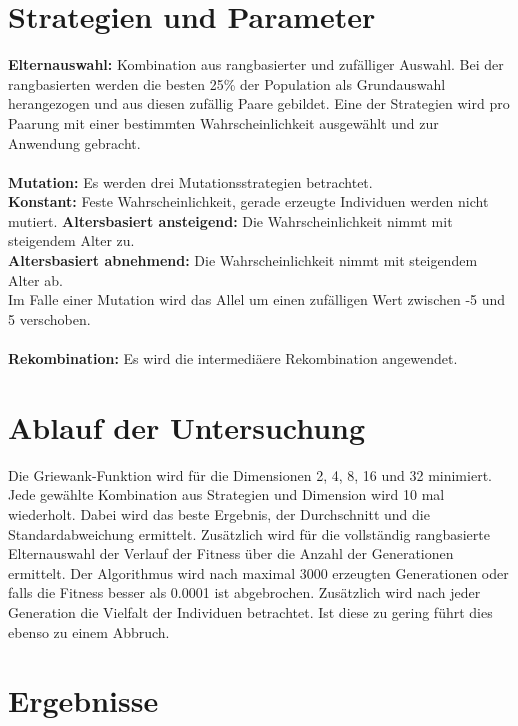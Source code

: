 \documentclass[12pt,
    a4paper,
    headinclude,
    footinclude]{scrartcl}
\begin{document}
	\section{Strategien und Parameter}

	\textbf{Elternauswahl:} Kombination aus rangbasierter und zufälliger Auswahl. Bei der rangbasierten werden die besten 25\% der Population als Grundauswahl herangezogen und aus diesen zufällig Paare gebildet.
	Eine der Strategien wird pro Paarung mit einer bestimmten Wahrscheinlichkeit ausgewählt und zur Anwendung gebracht. \\\\	
	\textbf{Mutation:} Es werden drei Mutationsstrategien betrachtet. \\
	\textbf{Konstant:} Feste Wahrscheinlichkeit, gerade erzeugte Individuen werden nicht mutiert.
	\textbf{Altersbasiert ansteigend:} Die Wahrscheinlichkeit nimmt mit steigendem Alter zu.\\
	\textbf{Altersbasiert abnehmend:} Die Wahrscheinlichkeit nimmt mit steigendem Alter ab. \\
	Im Falle einer Mutation wird das Allel um einen zufälligen Wert zwischen -5 und 5 verschoben. \\\\
	\textbf{Rekombination:} Es wird die intermediäere Rekombination angewendet.
	\section{Ablauf der Untersuchung}
	Die Griewank-Funktion wird für die Dimensionen 2, 4, 8, 16 und 32 minimiert. Jede gewählte Kombination aus Strategien und Dimension wird 10 mal wiederholt. Dabei wird das beste Ergebnis, der Durchschnitt und die Standardabweichung ermittelt. Zusätzlich wird für die vollständig rangbasierte Elternauswahl der Verlauf der Fitness über die Anzahl der Generationen ermittelt. Der Algorithmus wird nach maximal 3000 erzeugten Generationen oder falls die Fitness besser als 0.0001 ist abgebrochen. Zusätzlich wird nach jeder Generation die Vielfalt der Individuen betrachtet. Ist diese zu gering führt dies ebenso zu einem Abbruch.



	\section{Ergebnisse}
	\blindtext[5]
\end{document}

